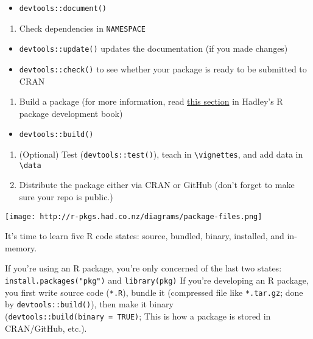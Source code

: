 \documentclass[
]{book}
\providecommand{\tightlist}{%
  \setlength{\itemsep}{0pt}\setlength{\parskip}{0pt}}
\begin{document}
\begin{itemize}
\tightlist
\item
  \texttt{devtools::document()}
\end{itemize}

\begin{enumerate}
\def\labelenumi{\arabic{enumi}.}
\setcounter{enumi}{5}
\tightlist
\item
  Check dependencies in \texttt{NAMESPACE}
\end{enumerate}

\begin{itemize}
\tightlist
\item
  \texttt{devtools::update()} updates the documentation (if you made changes)
\item
  \texttt{devtools::check()} to see whether your package is ready to be submitted to CRAN
\end{itemize}

\begin{enumerate}
\def\labelenumi{\arabic{enumi}.}
\setcounter{enumi}{6}
\tightlist
\item
  Build a package (for more information, read \href{http://r-pkgs.had.co.nz/package.html}{this section} in Hadley's R package development book)
\end{enumerate}

\begin{itemize}
\tightlist
\item
  \texttt{devtools::build()}
\end{itemize}

\begin{enumerate}
\def\labelenumi{\arabic{enumi}.}
\setcounter{enumi}{7}
\tightlist
\item
  (Optional) Test (\texttt{devtools::test()}), teach in \texttt{\textbackslash{}vignettes}, and add data in \texttt{\textbackslash{}data}
\item
  Distribute the package either via CRAN or GitHub (don't forget to make sure your repo is public.)
\end{enumerate}

\texttt{[image: http://r-pkgs.had.co.nz/diagrams/package-files.png]}

It's time to learn five R code states: source, bundled, binary, installed, and in-memory.

If you're using an R package, you're only concerned of the last two states: \texttt{install.packages("pkg")} and \texttt{library(pkg)} If you're developing an R package, you first write source code (\texttt{*.R}), bundle it (compressed file like \texttt{*.tar.gz}; done by \texttt{devtools::build()}), then make it binary (\texttt{devtools::build(binary\ =\ TRUE)}; This is how a package is stored in CRAN/GitHub, etc.).
\end{document}
